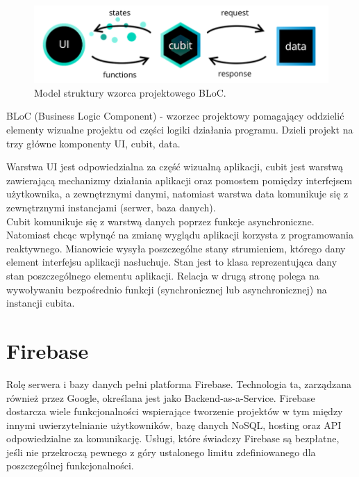 \begin{figure}[h!]
	\begin{center}
		\includegraphics[width=1\textwidth]{img/cubit.png}
	\end{center}
	\caption{{\color{dgray}Model struktury wzorca projektowego BLoC.}} 
	\label{struktura_BLoC}
\end{figure}  

BLoC (Business Logic Component) - wzorzec projektowy pomagający oddzielić elementy wizualne projektu od części logiki działania programu. Dzieli projekt na trzy główne komponenty UI, cubit, data.

Warstwa UI jest odpowiedzialna za część wizualną aplikacji, cubit jest warstwą zawierającą mechanizmy działania aplikacji oraz pomostem pomiędzy interfejsem użytkownika, a zewnętrznymi danymi, natomiast warstwa data komunikuje się z zewnętrznymi instancjami (serwer, baza danych).\\

Cubit komunikuje się z warstwą danych poprzez funkcje asynchroniczne. Natomiast chcąc wpłynąć na zmianę wyglądu aplikacji korzysta z programowania reaktywnego. Mianowicie wysyła poszczególne stany strumieniem, którego dany element interfejsu aplikacji nasłuchuje. Stan jest to klasa reprezentująca dany stan poszczególnego elementu aplikacji. Relacja w drugą stronę polega na wywoływaniu bezpośrednio funkcji (synchronicznej lub asynchronicznej) na instancji cubita.

\section{Firebase}

Rolę serwera i bazy danych pełni platforma Firebase. Technologia ta, zarządzana również przez Google, określana jest jako Backend-as-a-Service. Firebase dostarcza wiele funkcjonalności
wspierające tworzenie projektów w tym między innymi uwierzytelnianie użytkowników, bazę danych NoSQL, hosting oraz API odpowiedzialne za komunikację. Usługi, które świadczy Firebase są bezpłatne, jeśli nie przekroczą pewnego z góry ustalonego limitu zdefiniowanego dla poszczególnej funkcjonalności. \\

